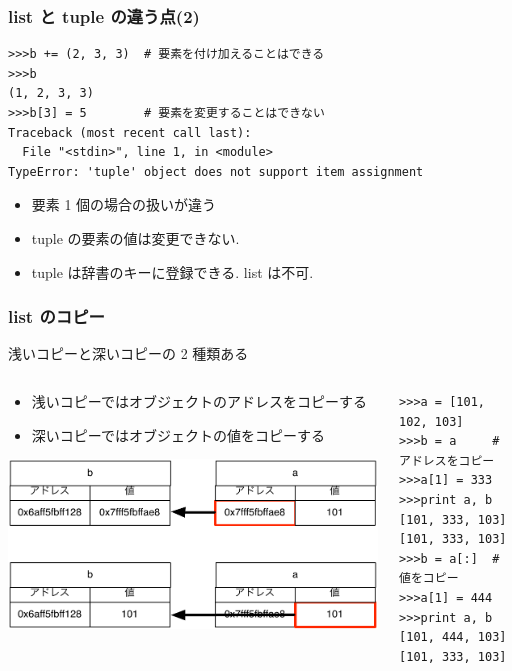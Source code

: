 \begin{frame}[t,fragile]
\frametitle{list と tuple の違う点(2)}
\begin{lstlisting}
>>>b += (2, 3, 3)  # 要素を付け加えることはできる
>>>b
(1, 2, 3, 3)
>>>b[3] = 5        # 要素を変更することはできない
Traceback (most recent call last):
  File "<stdin>", line 1, in <module>
TypeError: 'tuple' object does not support item assignment
\end{lstlisting}
\begin{itemize}
\item 要素 1 個の場合の扱いが違う
\item tuple の要素の値は変更できない. 
\item tuple は辞書のキーに登録できる. list は不可. 
\end{itemize}

\end{frame}

\begin{frame}[t,fragile]
\frametitle{list のコピー}
浅いコピーと深いコピーの 2 種類ある
\begin{columns}
\begin{column}{5cm}
\begin{itemize}
\item 浅いコピーではオブジェクトのアドレスをコピーする
\item 深いコピーではオブジェクトの値をコピーする
\end{itemize}
\includegraphics[width = \textwidth]{copy.pdf}
\end{column}

\begin{column}{7cm}
\begin{lstlisting}
>>>a = [101, 102, 103]                 
>>>b = a     # アドレスをコピー
>>>a[1] = 333
>>>print a, b 
[101, 333, 103] [101, 333, 103]
>>>b = a[:]  # 値をコピー
>>>a[1] = 444
>>>print a, b
[101, 444, 103] [101, 333, 103]
\end{lstlisting}
\end{column}
\end{columns}

\end{frame}


